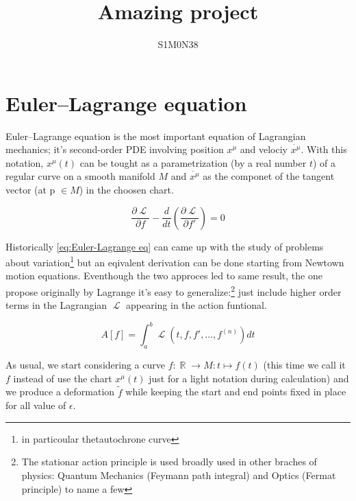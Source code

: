 \documentclass[a4paper]{article}
\title{Amazing project}
\author{S1M0N38}
\DeclareMathOperator{\Lagr}{\mathcal{L}} %
\DeclareMathOperator{\R}{\mathbb{R}} %
\begin{document}
  \maketitle
  \newpage

  \begin{abstract}
    \lipsum[1]
  \end{abstract}
  \newpage


  \section{Euler–Lagrange equation}

  Euler–Lagrange equation is the most important equation of Lagrangian
  mechanics; it's second-order PDE involving position $x^{\mu}$ and velociy
  $\dot{x^{\mu}}$. With this notation, $x^{\mu}(t)$ can be tought as a
  parametrization (by a real number $t$) of a regular curve on a smooth
  manifold $M$ and $\dot{x^{\mu}}$ as the componet of the tangent vector (at
  p $\in M$) in the choosen chart.

  \begin{equation} \label{eq:Euler-Lagrange eq}
    \frac{\partial\Lagr}{\partial f} -
    \frac{d}{dt}\left(\frac{\partial\Lagr}{\partial f'}\right) = 0
  \end{equation}

  Historically \eqref{eq:Euler-Lagrange eq} can came up with the study of
  problems about variation\footnote{in particoular thetautochrone curve} but
  an eqivalent derivation can be done starting from Newtown motion equations.
  Eventhough the two approces led to same result, the one
  propose originally by Lagrange it's easy to generalize:\footnote{The
  stationar action principle is used broadly used in other braches of physics:
  Quantum Mechanics (Feymann path integral) and Optics (Fermat principle) to
  name a few} just include higher order terms in the Lagrangian $\Lagr$
  appearing in the action funtional.

  \begin{equation*}
    A[f] = \int_{a}^{b} \Lagr(t, f, f', \ldots, f^{(n)}) dt
  \end{equation*}

  As usual, we start considering a curve $f: \R \rightarrow M: t \mapsto f(t)$
  (this time we call it $f$ instead of use the chart $x^{\mu}(t)$ just for
  a light notation during calculation) and we produce a deformation $\tilde{f}$
  while keeping the start and end points fixed in place for all value of
  $\epsilon$.
\end{document}
